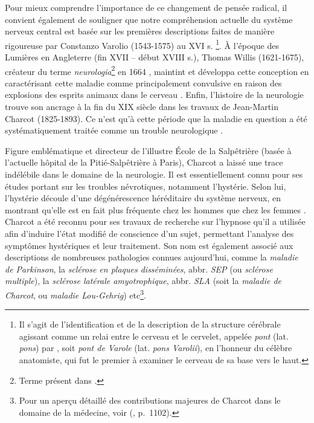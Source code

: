 Pour mieux comprendre l'importance de ce changement de pensée radical, il convient également de souligner que notre compréhension actuelle du système nerveux central est basée sur les premières descriptions faites de manière rigoureuse par Constanzo Varolio (1543-1575) au XVI\ieme{} s. \citep[p.~734]{tubbs2008costanzo}\footnote{Il s'agit de l'identification et de la description de la structure cérébrale agissant comme un relai entre le cerveau et le cervelet, appelée \textit{pont} (lat. \textit{pons}) par \citet{varolio1969nervis}, soit \textit{pont de Varole} (lat. \textit{pons Varolii}), en l'honneur du célèbre anatomiste, qui fut le premier à examiner le cerveau de sa base vers le haut.  
}. À l'époque des Lumières en Angleterre (fin XVII\ieme{} -- début XVIII\ieme{} s.), Thomas Willis (1621-1675), créateur du terme \textit{neurologia}\footnote{Terme présent dans \citet{willis1664cerebri}.} en 1664 \citep[p.~2]{monteiro2021}, maintint et développa cette conception en caractérisant cette maladie comme principalement convulsive en raison des explosions des \og{}esprits animaux\fg{} dans le cerveau \citep[p.~1]{willis1681essay}. Enfin, l'histoire de la neurologie trouve son ancrage à la fin du XIX\ieme{} siècle dans les travaux de Jean-Martin Charcot (1825-1893). Ce n'est qu'à cette période que la maladie en question a été systématiquement traitée comme un trouble neurologique \citep[p.~114]{tasca2012women}. 

\label{JMC_polymathe}

Figure emblématique et directeur de l'illustre École de la Salpêtrière (basée à l'actuelle hôpital de la Pitié-Salpêtrière à Paris), Charcot a laissé une trace indélébile dans le domaine de la neurologie. 
Il est essentiellement connu pour ses études portant sur les troubles névrotiques, notamment l'hystérie. Selon lui, l'hystérie découle d'une dégénérescence héréditaire du système nerveux, en montrant qu'elle est en fait plus fréquente chez les hommes que chez les femmes \citep[p.~114]{tasca2012women}. Charcot a été reconnu pour ses travaux de recherche sur l'hypnose qu'il a utilisée afin d'induire l'état modifié de conscience d'un sujet, permettant l'analyse des symptômes hystériques et leur traitement. 
Son nom est également associé aux descriptions de nombreuses pathologies connues aujourd'hui, comme la \textit{maladie de Parkinson}, la \textit{sclérose en plaques disséminées}, abbr. \textit{SEP} (ou \textit{sclérose multiple}), la \textit{sclérose latérale amyotrophique}, abbr. \textit{SLA} (soit la \textit{maladie de Charcot}, ou \textit{maladie Lou-Gehrig}) etc\footnote{Pour un aperçu détaillé des contributions majeures de Charcot dans le domaine de la médecine, voir \citeauthor{camargo2024} (\citeyear{camargo2024}, p.~1102).}.

